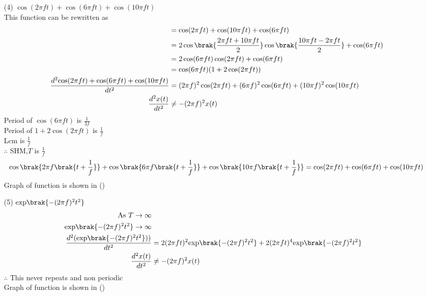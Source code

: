 \documentclass[journal,12pt,onecolumn]{IEEEtran}
\theoremstyle{remark}
\begin{document}
\begin{enumerate}
 \item[(4)]  $\cos(2\pi f t)+\cos(6\pi  f t)+\cos(10\pi  f t)$\\

This function can be rewritten as\\ 
 \begin{align}
  &=\cos(2\pi f t)+\cos(10\pi  f t)+\cos(6\pi  f t)\\
  &=2\cos\brak{\frac{2\pi f t+10\pi f t}{2}}\cos\brak{\frac{10\pi  f t-2\pi f t}{2}} +\cos(6\pi f t)\\
  &=2\cos(6\pi  f t) \cos(2\pi f t)+\cos(6\pi  f t)\\
  &=\cos(6\pi  f t) (1+2\cos(2\pi f t))\\
     \frac{d^2{\cos(2\pi f t)+\cos(6\pi  f t)+\cos(10\pi  f t)}}{dt^2}&=(2\pi f)^2\cos(2\pi f t)+(6\pi f)^2\cos(6\pi  f t)+(10\pi f)^2\cos(10\pi  f t)\\
      \frac{d^2 x(t)}{dt^2} &\neq - (2\pi f)^2 x(t)
 \end{align}
 Period of $\cos(6\pi  f t)$ is $\frac{1}{3f}$\\ 
 Period of $1+2\cos(2\pi f t)$ is $\frac{1}{f}$\\ 
 Lcm is $\frac{1}{f}$\\
 $\therefore$  SHM,$T$ is $\frac{1}{f}$\\
 \begin{align}   
 \cos\brak{2\pi f \brak{t+\frac{1}{f}}}+\cos\brak{6\pi  f \brak{t+\frac{1}{f}}}+\cos\brak{10\pi  f \brak{t+\frac{1}{f}}}=\cos(2\pi f t)+\cos(6\pi  f t)+\cos(10\pi  f t)
 \end{align}
 Graph of function is shown in ()
 \\

 \item[(5)]  $\text{exp}\brak{-(2\pi f)^2 t^2}$\\

       \begin{align}
     \text{As } T\to\infty\\
    \text{exp}\brak{-(2\pi f)^2 t^2}\to \infty\\ 
    \frac{d^2(\text{exp}\brak{-(2\pi f)^2 t^2}))}{dt^2}&=2(2\pi ft)^2\text{exp}\brak{-(2\pi f)^2 t^2}+2(2\pi ft)^4\text{exp}\brak{-(2\pi f)^2 t^2}\\
    \frac{d^2 x(t)}{dt^2} &\neq - (2\pi f)^2 x(t)
       \end{align}
    $\therefore$  This never repeats and non periodic\\
    Graph of function is shown in ()
    \\
    

\end{enumerate}
\end{document}
